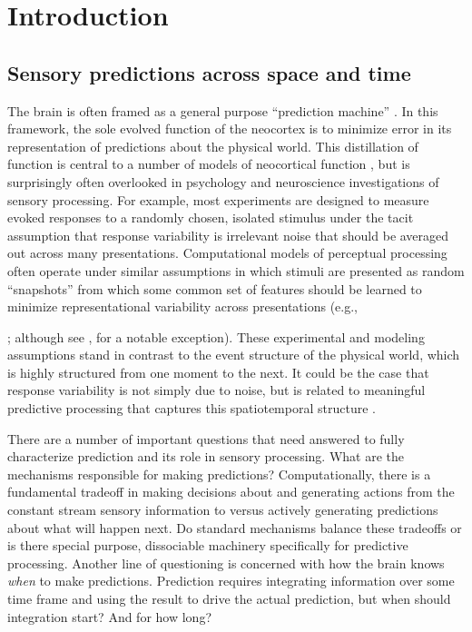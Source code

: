 \documentclass[dwyatte_dissertation.tex]{subfiles}
\begin{document}
\chapter{Introduction}
\label{chap:intro}

\section{Sensory predictions across space and time}
The brain is often framed as a general purpose ``prediction machine'' \cite{HawkinsBlakeslee04,Clark13}. In this framework, the sole evolved function of the neocortex is to minimize error in its representation of predictions about the physical world. This distillation of function is central to a number of models of neocortical function \cite[e.g.,]{DayanHintonNealEtAl95,RaoBallard99,LeeMumford03,Friston05,GeorgeHawkins09}, but is surprisingly often overlooked in psychology and neuroscience investigations of sensory processing. For example, most experiments are designed to measure evoked responses to a randomly chosen, isolated stimulus under the tacit assumption that response variability is irrelevant noise that should be averaged out across many presentations. Computational models of perceptual processing often operate under similar assumptions in which stimuli are presented as random ``snapshots'' from which some common set of features should be learned to minimize representational variability across presentations (e.g., {; although see , for a notable exception). These experimental and modeling assumptions stand in contrast to the event structure of the physical world, which is highly structured from one moment to the next. It could be the case that response variability is not simply due to noise, but is related to meaningful predictive processing that captures this spatiotemporal structure \cite{ArieliSterkinGrinvaldEtAl96,WilderJonesAhmedEtAl13,FischerWhitney14}.

There are a number of important questions that need answered to fully characterize prediction and its role in sensory processing. What are the mechanisms responsible for making predictions? Computationally, there is a fundamental tradeoff in making decisions about and generating actions from the constant stream sensory information to versus actively generating predictions about what will happen next. Do standard mechanisms balance these tradeoffs or is there special purpose, dissociable machinery specifically for predictive processing. Another line of questioning is concerned with how the brain knows \textit{when} to make predictions. Prediction requires integrating information over some time frame and using the result to drive the actual prediction, but when should integration start? And for how long? 

}
\end{document}
